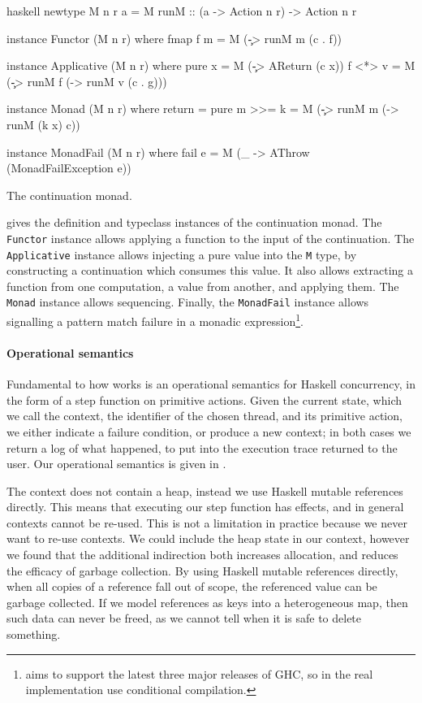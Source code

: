 \begin{listing}
\centering
\begin{cminted}{haskell}
newtype M n r a = M { runM :: (a -> Action n r) -> Action n r }

instance Functor (M n r) where
  fmap f m = M (\c -> runM m (c . f))

instance Applicative (M n r) where
  pure x  = M (\c -> AReturn (c x))
  f <*> v = M (\c -> runM f (\g -> runM v (c . g)))

instance Monad (M n r) where
  return  = pure
  m >>= k = M (\c -> runM m (\x -> runM (k x) c))

instance MonadFail (M n r) where
  fail e = M (\_ -> AThrow (MonadFailException e))
\end{cminted}
\caption{The \dejafu{} continuation monad.}\label{lst:m}
\end{listing}

 gives the definition and typeclass instances of the
\dejafu{} continuation monad.  The \verb|Functor| instance allows
applying a function to the input of the continuation.  The
\verb|Applicative| instance allows injecting a pure value into the
\verb|M| type, by constructing a continuation which consumes this
value.  It also allows extracting a function from one computation, a
value from another, and applying them.  The \verb|Monad| instance
allows sequencing.  Finally, the \verb|MonadFail| instance allows
signalling a pattern match failure in a monadic
expression\footnote{\dejafu{} aims to support the latest three major
  releases of GHC, so in the real implementation use conditional
  compilation.}.

\paragraph{Operational semantics}
Fundamental to how \dejafu{} works is an operational semantics for
Haskell concurrency, in the form of a step function on primitive
actions.  Given the current state, which we call the context, the
identifier of the chosen thread, and its primitive action, we either
indicate a failure condition, or produce a new context; in both cases
we return a log of what happened, to put into the execution trace
returned to the user.  Our operational semantics is given in
.

The context does not contain a heap, instead we use Haskell mutable
references directly.  This means that executing our step function has
effects, and in general contexts cannot be re-used.  This is not a
limitation in practice because we never want to re-use contexts.  We
could include the heap state in our context, however we found that the
additional indirection both increases allocation, and reduces the
efficacy of garbage collection.  By using Haskell mutable references
directly, when all copies of a reference fall out of scope, the
referenced value can be garbage collected.  If we model references as
keys into a heterogeneous map, then such data can never be freed, as
we cannot tell when it is safe to delete something.

